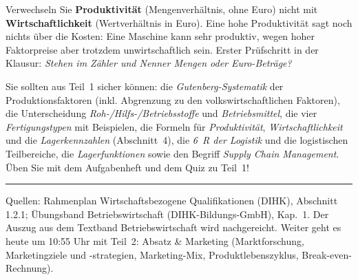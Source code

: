 \documentclass[11pt, a4paper]{article}
\begin{document}
\begin{achtung}
Verwechseln Sie \textbf{Produktivität} (Mengenverhältnis, ohne Euro) nicht mit
\textbf{Wirtschaftlichkeit} (Wertverhältnis in Euro). Eine hohe Produktivität sagt noch
nichts über die Kosten: Eine Maschine kann sehr produktiv, wegen hoher Faktorpreise
aber trotzdem unwirtschaftlich sein. Erster Prüfschritt in der Klausur:
\emph{Stehen im Zähler und Nenner Mengen oder Euro-Beträge?}
\end{achtung}

\begin{merksatz}[title={\bfseries Wichtig für die Prüfungsvorbereitung}]
Sie sollten aus Teil~1 sicher können: die \emph{Gutenberg-Systematik} der
Produktionsfaktoren (inkl. Abgrenzung zu den volkswirtschaftlichen Faktoren), die
Unterscheidung \emph{Roh-/Hilfs-/Betriebsstoffe} und \emph{Betriebsmittel}, die vier
\emph{Fertigungstypen} mit Beispielen, die Formeln für \emph{Produktivität},
\emph{Wirtschaftlichkeit} und die \emph{Lagerkennzahlen} (Abschnitt~4), die
\emph{6~R der Logistik} und die logistischen Teilbereiche, die \emph{Lagerfunktionen}
sowie den Begriff \emph{Supply Chain Management}. Üben Sie mit dem Aufgabenheft und dem
Quiz zu Teil~1!
\end{merksatz}

\vspace{1em}
\hrule
\vspace{0.8em}
\noindent\textsf{\small Quellen: Rahmenplan Wirtschaftsbezogene Qualifikationen (DIHK), Abschnitt 1.2.1;
Übungsband Betriebswirtschaft (DIHK-Bildungs-GmbH), Kap.~1. Der Auszug aus dem Textband
Betriebswirtschaft wird nachgereicht. Weiter geht es heute um 10:55 Uhr mit Teil~2:
Absatz \& Marketing (Marktforschung, Marketingziele und -strategien, Marketing-Mix,
Produktlebenszyklus, Break-even-Rechnung).}
\end{document}
